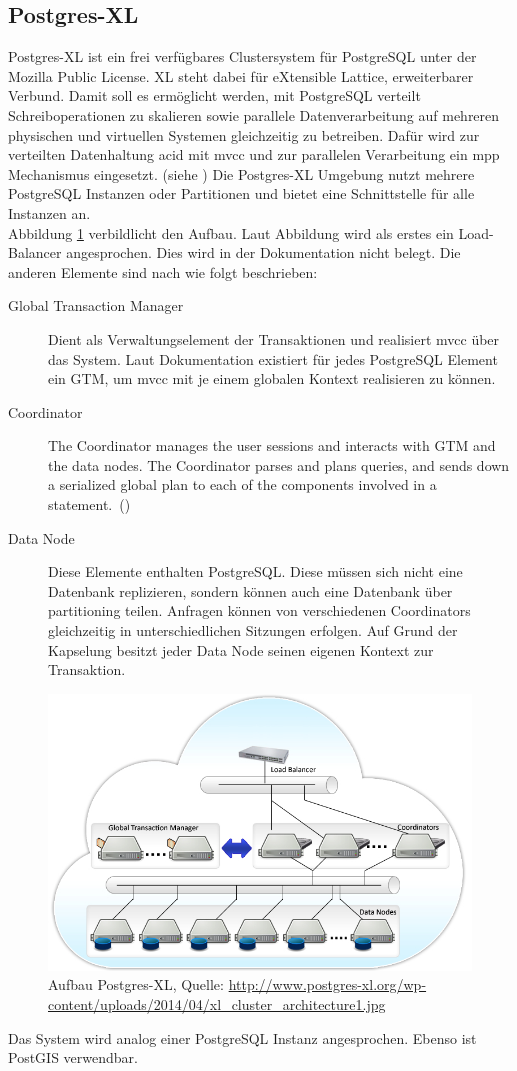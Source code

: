 \subsection{Postgres-XL}
Postgres-XL ist ein frei verfügbares Clustersystem für PostgreSQL unter der Mozilla Public License.
XL steht dabei für eXtensible Lattice, erweiterbarer Verbund.
Damit soll es ermöglicht werden, mit PostgreSQL verteilt Schreiboperationen zu skalieren sowie parallele Datenverarbeitung auf mehreren physischen und virtuellen Systemen gleichzeitig zu betreiben.
Dafür wird zur verteilten Datenhaltung \Gls{acid} mit \Gls{mvcc} und zur parallelen Verarbeitung ein \Gls{mpp} Mechanismus eingesetzt. (siehe \cite{website:postgresxl-about})
Die Postgres-XL Umgebung nutzt mehrere PostgreSQL Instanzen oder Partitionen und bietet eine Schnittstelle für alle Instanzen an.\\
Abbildung \ref{fig:postgresxl} verbildlicht den Aufbau.
Laut Abbildung wird als erstes ein Load-Balancer angesprochen.
Dies wird in der Dokumentation nicht belegt.
Die anderen Elemente sind nach \cite{website:postgresxl-about} wie folgt beschrieben:
\begin{description}
\item[Global Transaction Manager] Dient als Verwaltungselement der Transaktionen und realisiert \Gls{mvcc} über das System. Laut Dokumentation existiert für jedes PostgreSQL Element ein GTM, um \Gls{mvcc}  mit je einem globalen Kontext realisieren zu können.
\item[Coordinator] \glqq The Coordinator manages the user sessions and interacts with GTM and the data nodes. The Coordinator parses and plans queries, and sends down a serialized global plan to each of the components involved in a statement.\grqq\ (\cite{website:postgresxl-overview})
\item[Data Node] Diese Elemente enthalten PostgreSQL. Diese müssen sich nicht eine Datenbank replizieren, sondern können auch eine Datenbank über partitioning teilen. Anfragen können von verschiedenen Coordinators gleichzeitig in unterschiedlichen Sitzungen erfolgen. Auf Grund der Kapselung besitzt jeder Data Node seinen eigenen Kontext zur Transaktion.
\end{description}
\begin{figure}[h!]
\centering
\includegraphics[width=.7\textwidth]{Abbildungen/postgresxl-structure.jpg}
\caption[Aufbau Postgres-XL]{Aufbau Postgres-XL, Quelle: \url{http://www.postgres-xl.org/wp-content/uploads/2014/04/xl_cluster_architecture1.jpg}}
\label{fig:postgresxl}
\end{figure}
Das System wird analog einer PostgreSQL Instanz angesprochen.
Ebenso ist PostGIS verwendbar.

